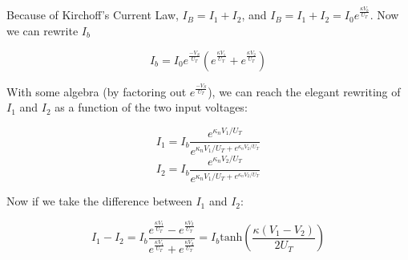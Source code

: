 Because of Kirchoff's Current Law, $I_B = I_1 + I_2$, and $I_B = I_1 + I_2 = I_0 e^{\frac{\kappa V_b}{U_T}}$. Now we can rewrite $I_b$

\begin{equation}
    I_b = I_0 e^{\frac{-V_S}{U_T}} (e^{\frac{\kappa V_1}{U_T}} + e^{\frac{\kappa V_2}{U_T}})
\end{equation}

With some algebra (by factoring out $e^{\frac{-V_S}{U_T}}$), we can reach the elegant rewriting of $I_1$ and $I_2$ as a function of the two input voltages:

\begin{equation}
    I_1 = I_b\frac{e^{\kappa_n V_1/U_T}}{e^{\kappa_n V_1/U_T + e^{\kappa_n V_2/U_T}}}
\end{equation}
\begin{equation}
    I_2 = I_b\frac{e^{\kappa_n V_2/U_T}}{e^{\kappa_n V_1/U_T + e^{\kappa_n V_2/U_T}}}
\end{equation}

Now if we take the difference between $I_1$ and $I_2$: 

\begin{equation}
    I_1 - I_2 = I_b\frac{e^{\frac{\kappa V_1}{U_T}} - e^{\frac{\kappa V_2}{U_T}}}{e^{\frac{\kappa V_1}{U_T}} + e^{\frac{\kappa V_2}{U_T}}} = I_b \mathrm{tanh}(\frac{\kappa (V_1 - V_2)}{2U_T}) 
\end{equation}

